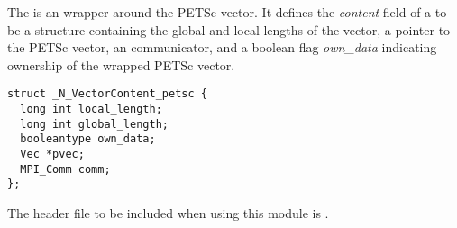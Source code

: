 %
The {\nvecpetsc} is an {\nvector} wrapper around the PETSc vector. It defines the 
{\em content} field of a  to be a structure containing the global 
and local lengths of the vector, a pointer to the PETSc vector,
an {\mpi} communicator, and a boolean flag {\em own\_data} indicating ownership of 
the wrapped PETSc vector.
\begin{verbatim} 
struct _N_VectorContent_petsc {
  long int local_length;
  long int global_length;
  booleantype own_data;
  Vec *pvec;
  MPI_Comm comm;
};
\end{verbatim}

The header file to be included when using this module is .


